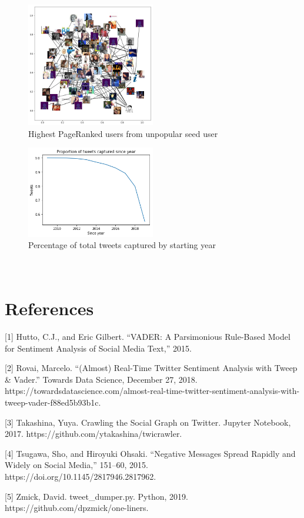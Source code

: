 \documentclass[11pt]{article}
\begin{document}
\begin{figure}[h!]
    \centering
     \includegraphics[width=0.5\textwidth]{nxgraph_unpopular_seed}
        \caption{Highest PageRanked users from unpopular seed user}
\end{figure}

\begin{figure}[h!]
    \centering
     \includegraphics[width=0.5\textwidth]{tweets_since_year}
        \caption{Percentage of total tweets captured by starting year}
\end{figure}

\section{\\References}

[1] Hutto, C.J., and Eric Gilbert. “VADER: A Parsimonious Rule-Based Model for Sentiment Analysis of Social Media Text,” 2015.\newline

[2] Rovai, Marcelo. “(Almost) Real-Time Twitter Sentiment Analysis with Tweep \& Vader.” Towards Data Science, December 27, 2018. https://towardsdatascience.com/almost-real-time-twitter-sentiment-analysis-with-tweep-vader-f88ed5b93b1c.\newline

[3] Takashina, Yuya. Crawling the Social Graph on Twitter. Jupyter Notebook, 2017.\newline
https://github.com/ytakashina/twicrawler.\newline

[4] Tsugawa, Sho, and Hiroyuki Ohsaki. “Negative Messages Spread Rapidly and Widely on Social Media,” 151–60, 2015. https://doi.org/10.1145/2817946.2817962.\newline

[5] Zmick, David. tweet\_dumper.py. Python, 2019. https://github.com/dpzmick/one-liners.
\end{document}
